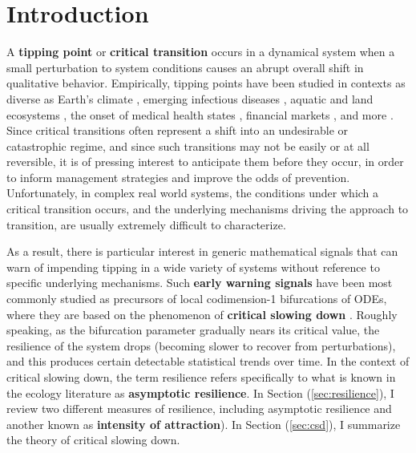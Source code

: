 
\section{Introduction}
\label{sec:intro}

A \textbf{tipping point} or \textbf{critical transition} occurs in a dynamical system when a small perturbation to system conditions causes an abrupt overall shift in qualitative behavior. 
%
Empirically, tipping points have been studied in contexts as diverse as 
Earth's climate \cite{lentonTippingElementsEarth2008, dakosSlowingEarlyWarning2008a}, 
emerging infectious diseases \cite{brettDynamicalFootprintsEnable2020}, 
aquatic and land ecosystems \cite{schefferCatastrophicShiftsEcosystems2001a, carpenterRisingVarianceLeading2006}, 
the onset of medical health states \cite{mcsharryPredictionEpilepticSeizures2003, venegasSelforganizedPatchinessAsthma2005}, 
financial markets \cite{gatfaouiFlickeringInformationSpreading2019},
and more \cite{georgeEarlyWarningSignals2021, schefferEarlywarningSignalsCritical2009a, boettigerEarlyWarningSignals2013}. 
%
Since critical transitions often represent a shift into an undesirable or catastrophic regime, and since such transitions may not be easily or at all reversible, %
it is of pressing interest to anticipate them before they occur, in order to inform management strategies and improve the odds of prevention. Unfortunately, in complex real world systems, the conditions under which a critical transition occurs, and the underlying mechanisms driving the approach to transition, are usually extremely difficult to characterize.

As a result, there is particular interest in generic mathematical signals that can warn of impending tipping in a wide variety of systems without reference to specific underlying mechanisms. Such \textbf{early warning signals} have been most commonly studied as precursors of local codimension-1 bifurcations of ODEs, where they are based on the phenomenon of \textbf{critical slowing down} \cite{schefferEarlywarningSignalsCritical2009a}. Roughly speaking, as the bifurcation parameter gradually nears its critical value, the resilience of the system drops (becoming slower to recover from perturbations), and this produces certain detectable statistical trends over time. In the context of critical slowing down, the term resilience refers specifically to what is known in the ecology literature as \textbf{asymptotic resilience}. In Section (\ref{sec:resilience}), I review two different measures of resilience, including asymptotic resilience and another known as \textbf{intensity of attraction}). In Section (\ref{sec:csd}), I summarize the theory of critical slowing down. 

